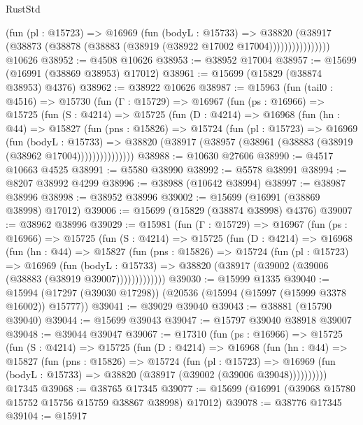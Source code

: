 \begin{lexlean}{RustStd}
\begin{coremodule}
                    (fun (pl : @15723) =>
                    @16969
                      (fun (bodyL : @15733) =>
                      @38820
                        (@38917
                          (@38873 (@38878 (@38883 (@38919 (@38922 @17002 @17004))))))))))))))))
    @10626
@38952 := @4508 @10626
@38953 := @38952 @17004
@38957 := @15699 (@16991 (@38869 @38953) @17012)
@38961 := @15699 (@15829 (@38874 @38953) @4376)
@38962 := @38922 @10626
@38987 := @15963
    (fun (tail0 : @4516) =>
    @15730
      (fun (Γ : @15729) =>
      @16967
        (fun (ps : @16966) =>
        @15725
          (fun (S : @4214) =>
          @15725
            (fun (D : @4214) =>
            @16968
              (fun (hn : @44) =>
              @15827
                (fun (pns : @15826) =>
                @15724
                  (fun (pl : @15723) =>
                  @16969
                    (fun (bodyL : @15733) =>
                    @38820 (@38917 (@38957 (@38961 (@38883 (@38919 (@38962 @17004)))))))))))))))
@38988 := @10630 @27606
@38990 := @4517 @10663 @4525
@38991 := @5580 @38990
@38992 := @5578 @38991
@38994 := @8207 @38992 @4299
@38996 := @38988 (@10642 @38994)
@38997 := @38987 @38996
@38998 := @38952 @38996
@39002 := @15699 (@16991 (@38869 @38998) @17012)
@39006 := @15699 (@15829 (@38874 @38998) @4376)
@39007 := @38962 @38996
@39029 := @15981
    (fun (Γ : @15729) =>
    @16967
      (fun (ps : @16966) =>
      @15725
        (fun (S : @4214) =>
        @15725
          (fun (D : @4214) =>
          @16968
            (fun (hn : @44) =>
            @15827
              (fun (pns : @15826) =>
              @15724
                (fun (pl : @15723) =>
                @16969
                  (fun (bodyL : @15733) =>
                  @38820 (@38917 (@39002 (@39006 (@38883 (@38919 @39007)))))))))))))
@39030 := @15999 @1335
@39040 := @15994 (@17297 (@39030 @17298)) (@20536 (@15994 (@15997 (@15999 @3378 @16002)) @15777))
@39041 := @39029 @39040
@39043 := @38881 (@15790 @39040)
@39044 := @15699 @39043
@39047 := @15797 @39040 @38918 @39007
@39048 := @39044 @39047
@39067 := @17310
    (fun (ps : @16966) =>
    @15725
      (fun (S : @4214) =>
      @15725
        (fun (D : @4214) =>
        @16968
          (fun (hn : @44) =>
          @15827
            (fun (pns : @15826) =>
            @15724
              (fun (pl : @15723) =>
              @16969 (fun (bodyL : @15733) => @38820 (@38917 (@39002 (@39006 @39048))))))))))
    @17345
@39068 := @38765 @17345
@39077 := @15699 (@16991 (@39068 @15780 @15752 @15756 @15759 @38867 @38998) @17012)
@39078 := @38776 @17345
@39104 := @15917

\end{coremodule}
\end{lexlean}
